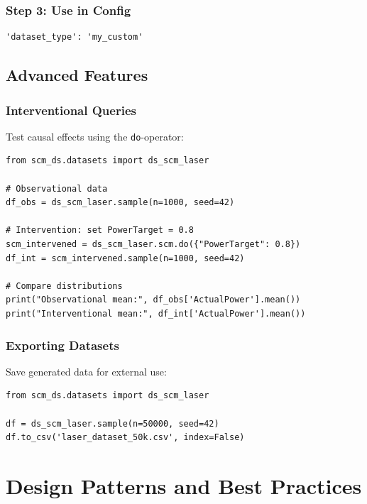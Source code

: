 \documentclass[11pt,a4paper]{article}
\begin{document}
\subsubsection{Step 3: Use in Config}

\begin{lstlisting}
'dataset_type': 'my_custom'
\end{lstlisting}

\subsection{Advanced Features}

\subsubsection{Interventional Queries}

Test causal effects using the \texttt{do}-operator:

\begin{lstlisting}[caption={Interventional Sampling}]
from scm_ds.datasets import ds_scm_laser

# Observational data
df_obs = ds_scm_laser.sample(n=1000, seed=42)

# Intervention: set PowerTarget = 0.8
scm_intervened = ds_scm_laser.scm.do({"PowerTarget": 0.8})
df_int = scm_intervened.sample(n=1000, seed=42)

# Compare distributions
print("Observational mean:", df_obs['ActualPower'].mean())
print("Interventional mean:", df_int['ActualPower'].mean())
\end{lstlisting}

\subsubsection{Exporting Datasets}

Save generated data for external use:

\begin{lstlisting}[caption={Export to CSV}]
from scm_ds.datasets import ds_scm_laser

df = ds_scm_laser.sample(n=50000, seed=42)
df.to_csv('laser_dataset_50k.csv', index=False)
\end{lstlisting}

\section{Design Patterns and Best Practices}
\end{document}
